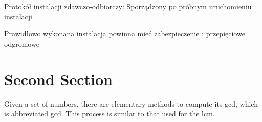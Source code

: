 \documentclass{article}
\begin{document}
Protokół instalacji zdawczo-odbiorczy:
Sporządzony po próbnym uruchomieniu instalacji 

Prawidłowo wykonana instalacja powinna mieć zabezpieczenie :
przepięciowe
odgromowe





























\clearpage

\section{Second Section}

\vspace{5mm}

Given a set of numbers, there are elementary methods to compute its \acrlong{gcd}, which is abbreviated \acrshort{gcd}. This process is similar to that used for the \acrfull{lcm}.


\clearpage

\printglossary

\clearpage

\printglossary[type=\acronymtype]
\end{document}
